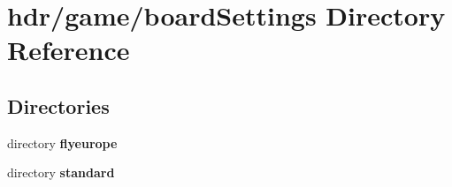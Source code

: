 \section{hdr/game/board\-Settings Directory Reference}
\label{dir_2f9810e2397a51124c80ca12905a3716}
\subsection*{Directories}
\begin{DoxyCompactItemize}
\item 
directory {\bf flyeurope}
\item 
directory {\bf standard}
\end{DoxyCompactItemize}
